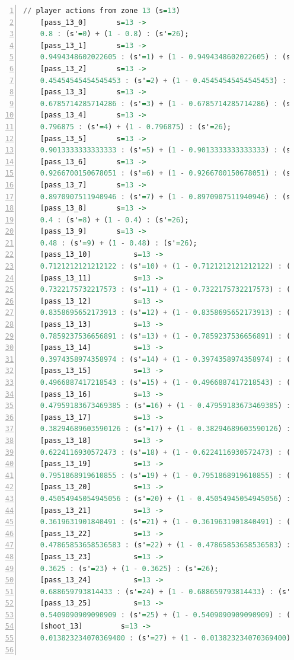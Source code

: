\documentclass{l4proj}
\begin{document}
\begin{appendices}
\begin{lstlisting}[language=Haskell, numbers=left, caption=MDP used for strategy generation. This is the model specification as-is after the refinements at the end of chapter 3.]
	// player actions from zone 13 (s=13)
	[pass_13_0]	      s=13 ->
	0.8 : (s'=0) + (1 - 0.8) : (s'=26);
	[pass_13_1]	      s=13 ->
	0.9494348602022605 : (s'=1) + (1 - 0.9494348602022605) : (s'=26);
	[pass_13_2]	      s=13 ->
	0.45454545454545453 : (s'=2) + (1 - 0.45454545454545453) : (s'=26);
	[pass_13_3]	      s=13 ->
	0.6785714285714286 : (s'=3) + (1 - 0.6785714285714286) : (s'=26);
	[pass_13_4]	      s=13 ->
	0.796875 : (s'=4) + (1 - 0.796875) : (s'=26);
	[pass_13_5]	      s=13 ->
	0.9013333333333333 : (s'=5) + (1 - 0.9013333333333333) : (s'=26);
	[pass_13_6]	      s=13 ->
	0.9266700150678051 : (s'=6) + (1 - 0.9266700150678051) : (s'=26);
	[pass_13_7]	      s=13 ->
	0.8970907511940946 : (s'=7) + (1 - 0.8970907511940946) : (s'=26);
	[pass_13_8]	      s=13 ->
	0.4 : (s'=8) + (1 - 0.4) : (s'=26);
	[pass_13_9]	      s=13 ->
	0.48 : (s'=9) + (1 - 0.48) : (s'=26);
	[pass_13_10]	      s=13 ->
	0.7121212121212122 : (s'=10) + (1 - 0.7121212121212122) : (s'=26);
	[pass_13_11]	      s=13 ->
	0.7322175732217573 : (s'=11) + (1 - 0.7322175732217573) : (s'=26);
	[pass_13_12]	      s=13 ->
	0.8358695652173913 : (s'=12) + (1 - 0.8358695652173913) : (s'=26);
	[pass_13_13]	      s=13 ->
	0.7859237536656891 : (s'=13) + (1 - 0.7859237536656891) : (s'=26);
	[pass_13_14]	      s=13 ->
	0.3974358974358974 : (s'=14) + (1 - 0.3974358974358974) : (s'=26);
	[pass_13_15]	      s=13 ->
	0.4966887417218543 : (s'=15) + (1 - 0.4966887417218543) : (s'=26);
	[pass_13_16]	      s=13 ->
	0.47959183673469385 : (s'=16) + (1 - 0.47959183673469385) : (s'=26);
	[pass_13_17]	      s=13 ->
	0.38294689603590126 : (s'=17) + (1 - 0.38294689603590126) : (s'=26);
	[pass_13_18]	      s=13 ->
	0.6224116930572473 : (s'=18) + (1 - 0.6224116930572473) : (s'=26);
	[pass_13_19]	      s=13 ->
	0.7951868919610855 : (s'=19) + (1 - 0.7951868919610855) : (s'=26);
	[pass_13_20]	      s=13 ->
	0.45054945054945056 : (s'=20) + (1 - 0.45054945054945056) : (s'=26);
	[pass_13_21]	      s=13 ->
	0.3619631901840491 : (s'=21) + (1 - 0.3619631901840491) : (s'=26);
	[pass_13_22]	      s=13 ->
	0.47865853658536583 : (s'=22) + (1 - 0.47865853658536583) : (s'=26);
	[pass_13_23]	      s=13 ->
	0.3625 : (s'=23) + (1 - 0.3625) : (s'=26);
	[pass_13_24]	      s=13 ->
	0.688659793814433 : (s'=24) + (1 - 0.688659793814433) : (s'=26);
	[pass_13_25]	      s=13 ->
	0.5409090909090909 : (s'=25) + (1 - 0.5409090909090909) : (s'=26);
	[shoot_13]	       s=13 ->
	0.013823234070369400 : (s'=27) + (1 - 0.013823234070369400) : (s'=26);


\end{lstlisting}
\end{appendices}
\end{document}

